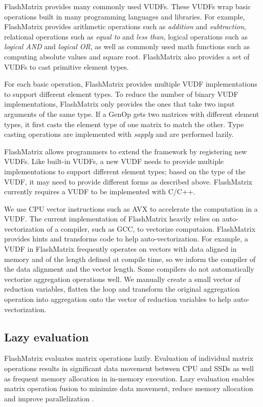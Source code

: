FlashMatrix provides many commonly used VUDFs. These VUDFs wrap
basic operations built in many programming languages and libraries. For example,
FlashMatrix provides arithmetic operations such as \textit{addition} and
\textit{subtraction}, relational operations such as \textit{equal to} and
\textit{less than}, logical operations such as \textit{logical AND} and
\textit{logical OR}, as well as commonly used math functions such as computing
absolute values and square root. FlashMatrix also provides a set of VUDFs to
cast primitive element types.

For each basic operation, FlashMatrix provides multiple VUDF
implementations to support different element types. To reduce the number
of binary VUDF implementations, FlashMatrix only provides the ones that take
two input arguments of the same type. If a GenOp gets two matrices with different
element types, it first casts the element type of one matrix to match
the other. %
Type casting operations are
implemented with \textit{sapply} and are performed lazily.

FlashMatrix allows programmers to extend the framework by registering new VUDFs.
Like built-in VUDFs, a new VUDF needs to provide multiple
implementations to support different element types; based on the type of
the VUDF, it may need to provide different forms as described above.
FlashMatrix currently requires a VUDF to be implemented with C/C++.

We use CPU vector instructions such as AVX \cite{avx} to accelerate
the computation in a VUDF. The current implementation of FlashMatrix heavily
relies on auto-vectorization of a compiler, such as GCC, to vectorize
computaion. FlashMatrix provides hints and
transforms code to help auto-vectorization. For example, a VUDF in FlashMatrix
frequently operates on vectors with data aligned in memory and of
the length defined at compile time, so we inform the compiler of the data alignment
and the vector length. Some compilers do not automatically vectorize
aggregation operations well. We manually create a small vector of reduction
variables, flatten the loop and transform the original aggregation operation
into aggregation onto the vector of reduction variables to help auto-vectorization.

\subsection{Lazy evaluation} \label{sec:lazy_eval}
FlashMatrix evaluates matrix operations lazily. Evaluation of individual
matrix operations results in significant data movement between CPU and SSDs
as well as frequent memory allocation in in-memory execution.
Lazy evaluation enables matrix operation fusion to minimize data movement,
reduce memory allocation and improve parallelization \cite{Ching12}.

